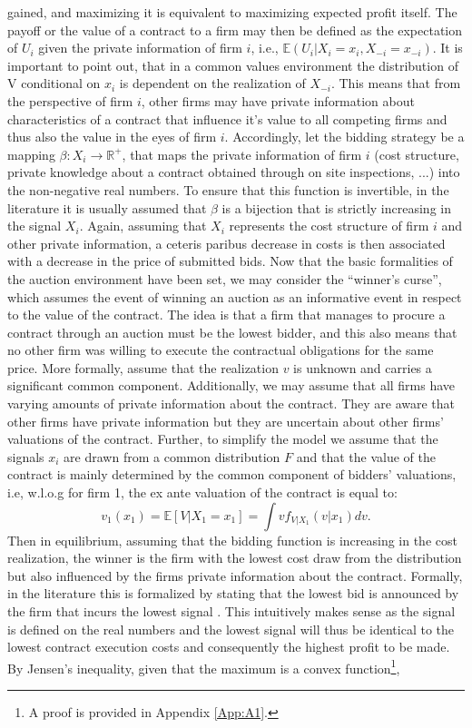 \documentclass[a4paper,12pt, headsepline]{scrartcl}
\numberwithin{equation}{section}
\begin{document}
gained, and maximizing it is equivalent to maximizing expected profit itself. The payoff or the value of a contract to a firm may then be defined as the expectation of $U_i$ given the private information of firm $i$, i.e., $\mathbb{E}(U_i|X_i = x_i, X_{-i} = x_{-i})$. It is important to point out, that in a common values environment the distribution of V conditional on $x_{i}$ is dependent on the realization of $X_{-i}$. This means that from the perspective of firm $i$, other firms may have private information about characteristics of a contract that influence it's value to all competing firms and thus also the value in the eyes of firm $i$. Accordingly, let the bidding strategy be a mapping $\beta: X_i \rightarrow \mathbb{R}^+$, that maps the private information of firm $i$ (cost structure, private knowledge about a contract obtained through on site inspections, ...) into the non-negative real numbers. To ensure that this function is invertible, in the literature it is usually assumed that $\beta$ is a bijection that is strictly increasing in the signal $X_i$. Again, assuming that $X_i$ represents the cost structure of firm $i$ and other private information, a ceteris paribus decrease in costs is then associated with a decrease in the price of submitted bids. Now that the basic formalities of the auction environment have been set, we may consider the \enquote{winner's curse}, which assumes the event of winning an auction as an informative event in respect to the value of the contract. The idea is that a firm that manages to procure a contract through an auction must be the lowest bidder, and this also means that no other firm was willing to execute the contractual obligations for the same price. More formally, assume that the realization $v$ is unknown and carries a significant common component. Additionally, we may assume that all firms have varying amounts of private information about the contract. They are aware that other firms have private information but they are uncertain about other firms' valuations of the contract. Further, to simplify the model we assume that the signals $x_i$ are drawn from a common distribution $F$ and that the value of the contract is mainly determined by the common component of bidders' valuations, i.e, w.l.o.g for firm 1, the ex ante valuation of the contract is equal to:
\[
v_1(x_1) = \mathbb{E}[V|X_1 = x_1]  = \int vf_{V|X_1}(v|x_1)dv.
\]
 Then in equilibrium, assuming that the bidding function is increasing in the cost realization, the winner is the firm with the lowest cost draw from the distribution but also influenced by the firms private information about the contract. Formally, in the literature this is formalized by stating that the lowest bid is announced by the firm that incurs the lowest signal \citep{HandbookIndustrialOrga}. This intuitively makes sense as the signal is defined on the real numbers and the lowest signal will thus be identical to the lowest contract execution costs and consequently the highest profit to be made. By Jensen's inequality, given that the maximum is a convex function\footnote{A proof is provided in Appendix \ref{App:A1}.}, 
\end{document}
